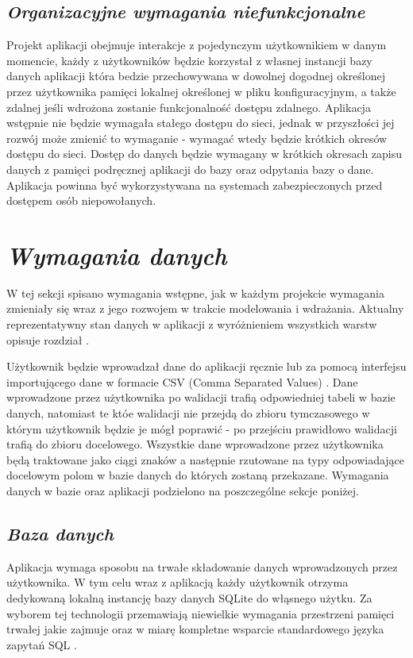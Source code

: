 \documentclass[a4paper,10pt, twoside]{report}
\newcommand{\customstylechapter}[1]{\large{\textit{#1}}}
\newcommand{\customstylesection}[1]{\textbf{\textit{#1}}}
\begin{document}
\section{\customstylesection{Organizacyjne wymagania niefunkcjonalne}}
{Projekt aplikacji obejmuje interakcje z pojedynczym użytkownikiem w danym 
momencie, każdy z użytkowników będzie korzystał z własnej instancji bazy 
danych aplikacji która bedzie przechowywana w dowolnej dogodnej określonej 
przez użytkownika pamięci lokalnej określonej w pliku konfiguracyjnym, a także 
zdalnej jeśli wdrożona zostanie funkcjonalność dostępu zdalnego. Aplikacja 
wstępnie nie będzie wymagała stałego dostępu do sieci, jednak w przyszłości 
jej rozwój może zmienić to wymaganie - wymagać wtedy będzie krótkich okresów 
dostępu do sieci. Dostęp do danych będzie wymagany w krótkich okresach zapisu 
danych z pamięci podręcznej aplikacji do bazy oraz odpytania bazy o dane. 
Aplikacja powinna być wykorzystywana na systemach zabezpieczonych przed dostępem
 osób niepowołanych.}

\chapter{\customstylechapter{Wymagania danych}}
{W tej sekcji spisano wymagania wstępne, jak w każdym projekcie wymagania 
zmieniały się wraz z jego rozwojem w trakcie modelowania i 
wdrażania. Aktualny reprezentatywny stan danych w aplikacji z wyróżnieniem 
wszystkich warstw opisuje rozdział .}

{Użytkownik będzie wprowadzał dane do aplikacji ręcznie lub za pomocą interfejsu
importującego dane w formacie CSV (Comma Separated Values) \cite{CSV}. Dane 
wprowadzone przez użytkownika po walidacji trafią odpowiedniej tabeli w bazie 
danych, natomiast te któe walidacji nie przejdą do zbioru tymczasowego w którym 
użytkownik będzie je mógł poprawić - po przejściu prawidłowo walidacji trafią 
do zbioru docelowego. Wszystkie dane wprowadzone przez użytkownika będą 
traktowane jako ciągi znaków a następnie rzutowane na typy odpowiadające 
docelowym polom w bazie danych do których zostaną przekazane. Wymagania 
danych w bazie oraz aplikacji podzielono na poszczególne sekcje poniżej.}

\section{\customstylesection{Baza danych}}
{Aplikacja wymaga sposobu na trwałe składowanie danych wprowadzonych przez 
użytkownika. W tym celu wraz z aplikacją każdy użytkownik otrzyma dedykowaną 
lokalną instancję bazy danych SQLite \cite{SQLite} do włąsnego użytku. Za 
wyborem tej technologii przemawiają niewielkie wymagania przestrzeni pamięci 
trwałej jakie zajmuje oraz w miarę kompletne wsparcie standardowego języka 
zapytań SQL \cite{SQL}.}
\end{document}
